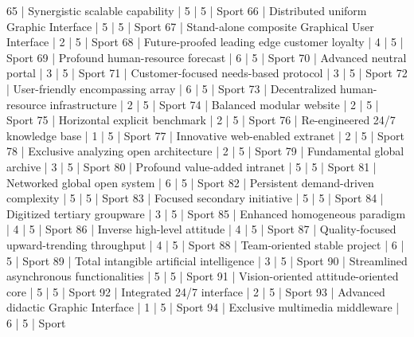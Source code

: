\begin{enumerate}
\begin{pseudo*}
      65 | Synergistic scalable capability                  |        5 |      5 | Sport
      66 | Distributed uniform Graphic Interface            |        5 |      5 | Sport
      67 | Stand-alone composite Graphical User Interface   |        2 |      5 | Sport
      68 | Future-proofed leading edge customer loyalty     |        4 |      5 | Sport
      69 | Profound human-resource forecast                 |        6 |      5 | Sport
      70 | Advanced neutral portal                          |        3 |      5 | Sport
      71 | Customer-focused needs-based protocol            |        3 |      5 | Sport
      72 | User-friendly encompassing array                 |        6 |      5 | Sport
      73 | Decentralized human-resource infrastructure      |        2 |      5 | Sport
      74 | Balanced modular website                         |        2 |      5 | Sport
      75 | Horizontal explicit benchmark                    |        2 |      5 | Sport
      76 | Re-engineered 24/7 knowledge base                |        1 |      5 | Sport
      77 | Innovative web-enabled extranet                  |        2 |      5 | Sport
      78 | Exclusive analyzing open architecture            |        2 |      5 | Sport
      79 | Fundamental global archive                       |        3 |      5 | Sport
      80 | Profound value-added intranet                    |        5 |      5 | Sport
      81 | Networked global open system                     |        6 |      5 | Sport
      82 | Persistent demand-driven complexity              |        5 |      5 | Sport
      83 | Focused secondary initiative                     |        5 |      5 | Sport
      84 | Digitized tertiary groupware                     |        3 |      5 | Sport
      85 | Enhanced homogeneous paradigm                    |        4 |      5 | Sport
      86 | Inverse high-level attitude                      |        4 |      5 | Sport
      87 | Quality-focused upward-trending throughput       |        4 |      5 | Sport
      88 | Team-oriented stable project                     |        6 |      5 | Sport
      89 | Total intangible artificial intelligence         |        3 |      5 | Sport
      90 | Streamlined asynchronous functionalities         |        5 |      5 | Sport
      91 | Vision-oriented attitude-oriented core           |        5 |      5 | Sport
      92 | Integrated 24/7 interface                        |        2 |      5 | Sport
      93 | Advanced didactic Graphic Interface              |        1 |      5 | Sport
      94 | Exclusive multimedia middleware                  |        6 |      5 | Sport

\end{pseudo*}
\end{enumerate}
